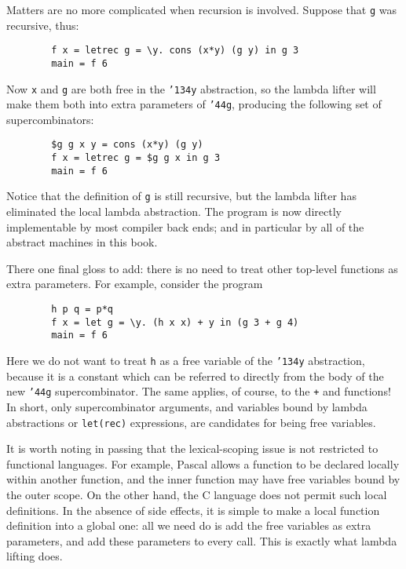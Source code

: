 Matters are no more complicated when recursion is involved.  Suppose
that \mbox{\tt g} was recursive, thus:
\begin{verbatim}
        f x = letrec g = \y. cons (x*y) (g y) in g 3
        main = f 6
\end{verbatim}
Now \mbox{\tt x} and \mbox{\tt g} are both free in the \mbox{\tt {\char'134}y} abstraction, so the lambda
lifter will make them both into extra parameters of \mbox{\tt {\char'44}g}, producing
the following set of supercombinators:
\begin{verbatim}
        $g g x y = cons (x*y) (g y)
        f x = letrec g = $g g x in g 3
        main = f 6
\end{verbatim}
Notice that the definition of \mbox{\tt g} is still recursive, but the lambda
lifter has eliminated the local lambda abstraction.  The program is
now directly implementable by most compiler back ends; and in
particular by all of the abstract machines in this book.

There one final gloss to add: there is no need to treat other top-level
functions as extra parameters.  For example, consider the program
\begin{verbatim}
        h p q = p*q
        f x = let g = \y. (h x x) + y in (g 3 + g 4)
        main = f 6
\end{verbatim}
Here we do not want to treat \mbox{\tt h} as a free variable of the
\mbox{\tt {\char'134}y} abstraction, because it is a constant which can be referred to
directly from the body of the new \mbox{\tt {\char'44}g} supercombinator.  The same
applies, of course, to the \mbox{\tt +} and \mbox{\tt *} functions!  In short, only
supercombinator arguments, and variables bound by lambda abstractions
or \mbox{\tt let(rec)} expressions, are candidates for being free variables.

It is worth noting in passing that the lexical-scoping issue is not restricted to functional languages.  For
example, Pascal allows a function to be declared locally within
another function, and the inner function may have free variables bound
by the outer scope.  On the other hand, the C language does not permit
such local definitions.  In the absence of side effects, it is simple
to make a local function definition into a global one: all we need do
is add the free variables as extra parameters, and add these
parameters to every call.  This is exactly what lambda lifting does.


